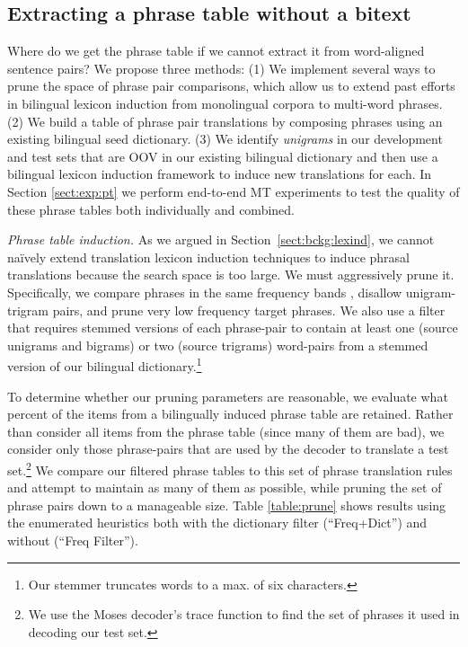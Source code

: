 \documentclass[11pt]{article}
\newcommand{\mtodo}[1]{}
\newcommand{\todo}[1]{\textcolor{red}{TODO: #1}}
\newcommand{\secref}[1]{Section~\ref{#1}}
\newcommand{\paraheader}[1]{\vskip 0.05in \noindent\emph{#1}}
\begin{document}
\subsection{Extracting a phrase table without a bitext}  \label{sect:extract}
Where do we get the phrase table if we cannot extract it from word-aligned sentence pairs? We propose three methods: (1) We implement several ways to prune the space of phrase pair comparisons, which allow us to extend past efforts in bilingual lexicon induction from monolingual corpora to multi-word phrases. (2) We build a table of phrase pair translations by composing phrases using an existing bilingual seed dictionary. (3) We identify \emph {unigrams} in our development and test sets that are OOV in our existing bilingual dictionary and then use a bilingual lexicon induction framework to induce new translations for each. In Section \ref{sect:exp:pt} we perform end-to-end MT experiments to test the quality of these phrase tables both individually and combined.

\paraheader{Phrase table induction.} As we argued in \secref{sect:bckg:lexind}, we cannot na\"{i}vely extend translation lexicon induction techniques to induce phrasal translations because the search space is too large. We must aggressively prune it.   Specifically, we compare phrases in the same frequency bands \cite{Uszkoreit:2010}, disallow unigram-trigram pairs, and prune very low frequency target phrases. We also use a filter that requires stemmed versions of each phrase-pair to contain at least one (source unigrams and bigrams) or two (source trigrams) word-pairs from a stemmed version of our bilingual dictionary.\footnote{Our stemmer truncates words to a max. of six characters.} %

To determine whether our pruning parameters are reasonable, we evaluate what percent of the items from a bilingually induced phrase table are retained.  Rather than consider all items from the phrase table (since many of them are bad), we consider only those phrase-pairs that are used by the decoder to translate a test set.\footnote{We use the Moses decoder's trace function to find the set of phrases it used in decoding our test set.} We compare our filtered phrase tables to this set of phrase translation rules and attempt to maintain as many of them as possible, while pruning the set of phrase pairs down to a manageable size. Table \ref{table:prune} shows results using the enumerated heuristics both with the dictionary filter (``Freq+Dict'') and without (``Freq Filter'').
\end{document}
